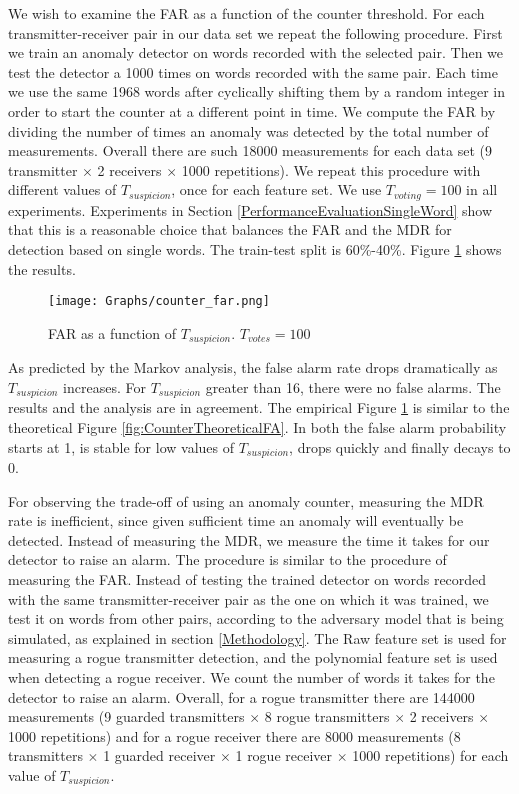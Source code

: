 \documentclass[compsoc,conference,a4paper,10pt,times]{IEEEtran}
\begin{document}
  We wish to examine the FAR as a function of the counter threshold. For each transmitter-receiver pair in our data set we repeat the following procedure. First we train an anomaly detector on words recorded with the selected pair. Then we test the detector a 1000 times on words recorded with the same pair. Each time we use the same 1968 words after cyclically shifting them by a random integer in order to start the counter at a different point in time. We compute the FAR by dividing the number of times an anomaly was detected by the total number of measurements. Overall there are such 18000 measurements for each data set (9 transmitter $\times$ 2 receivers $\times$ 1000 repetitions).
  We repeat this procedure with different values of $T_{suspicion}$, once for each feature set. We use $T_{voting} = 100$ in all experiments. Experiments in Section \ref{PerformanceEvaluationSingleWord} show that this is a reasonable choice that balances the FAR and the MDR for detection based on single words. The train-test split is 60\%-40\%. Figure \ref{fig:counter_far} shows the results.
  
  \begin{figure}[t]
    \centering
    \texttt{[image: Graphs/counter\_far.png]}
    \caption{FAR as a function of $T_{suspicion}$. $T_{votes} = 100$}
    \label{fig:counter_far}
  \end{figure}
  
  As predicted by the Markov analysis, the false alarm rate drops dramatically as $T_{suspicion}$ increases. For $T_{suspicion}$ greater than 16, there were no false alarms. The results and the analysis are in agreement. The empirical Figure \ref{fig:counter_far} is similar to the theoretical Figure \ref{fig:CounterTheoreticalFA}. In both the false alarm probability starts at 1, is stable for low values of $T_{suspicion}$, drops quickly and finally decays to 0.
  
  For observing the trade-off of using an anomaly counter, measuring the MDR rate is inefficient, since given sufficient time an anomaly will eventually be detected. Instead of measuring the MDR, we measure the time it takes for our detector to raise an alarm. The procedure is similar to the procedure of measuring the FAR. Instead of testing the trained detector on words recorded with the same transmitter-receiver pair as the one on which it was trained, we test it on words from other pairs, according to the adversary model that is being simulated, as explained in section \ref{Methodology}. The Raw feature set is used for measuring a rogue transmitter detection, and the polynomial feature set is used when detecting a rogue receiver. We count the number of words it takes for the detector to raise an alarm. Overall, for a rogue transmitter there are 144000 measurements (9 guarded transmitters $\times$ 8 rogue transmitters $\times$ 2 receivers $\times$ 1000 repetitions) and for a rogue receiver there are 8000 measurements (8 transmitters $\times$ 1 guarded receiver $\times$ 1 rogue receiver $\times$ 1000 repetitions) for each value of $T_{suspicion}$.
  
\end{document}
